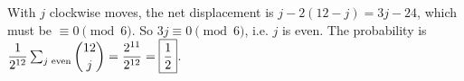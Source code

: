 With $j$ clockwise moves, the net displacement is $j-2(12-j)=3j-24$, which must be $\equiv0\pmod6$. So $3j\equiv0\pmod6$, i.e. $j$ is even. The probability is $\dfrac{1}{2^{12}}\sum_{j\text{ even}}\dbinom{12}j=\dfrac{2^{11}}{2^{12}}=\boxed{\dfrac12}$.
